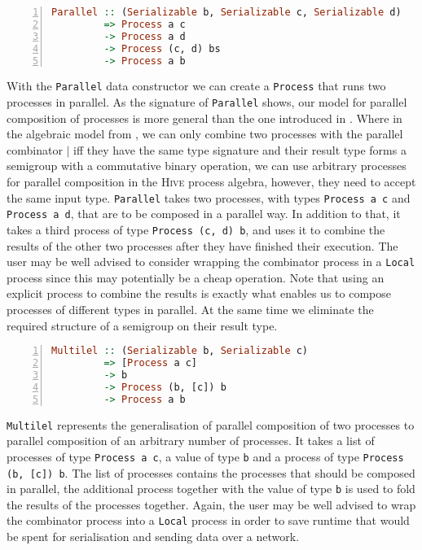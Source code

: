 \begin{lstlisting}[language=Haskell,caption=Signature of the \texttt{Parallel} type constructor.,numbers=left,frame=bt]
Parallel :: (Serializable b, Serializable c, Serializable d)
         => Process a c
         -> Process a d
         -> Process (c, d) bs
         -> Process a b
\end{lstlisting}
With the \texttt{Parallel} data constructor we can create a \texttt{Process} that runs two processes in parallel. As the signature of \texttt{Parallel} shows, our model for parallel composition of processes is more general than the one introduced in . Where in the algebraic model from , we can only combine two processes with the parallel combinator $|$ iff they have the same type signature and their result type forms a semigroup with a commutative binary operation, we can use arbitrary processes for parallel composition in the \textsc{Hive} process algebra, however, they need to accept the same input type. \texttt{Parallel} takes two processes, with types \texttt{Process a c} and \texttt{Process a d}, that are to be composed in a parallel way. In addition to that, it takes a third process of type \texttt{Process (c, d) b}, and uses it to combine the results of the other two processes after they have finished their execution. The user may be well advised to consider wrapping the combinator process in a \texttt{Local} process since this may potentially be a cheap operation. Note that using an explicit process to combine the results is exactly what enables us to compose processes of different types in parallel. At the same time we eliminate the required structure of a semigroup on their result type.

\begin{lstlisting}[language=Haskell,caption=Signature of the \texttt{Multilel} type constructor.,numbers=left,frame=bt]
Multilel :: (Serializable b, Serializable c)
         => [Process a c]
         -> b
         -> Process (b, [c]) b
         -> Process a b
\end{lstlisting}
\texttt{Multilel} represents the generalisation of parallel composition of two processes to parallel composition of an arbitrary number of processes. It takes a list of processes of type \texttt{Process a c}, a value of type \texttt{b} and a process of type \texttt{Process (b, [c]) b}. The list of processes contains the processes that should be composed in parallel, the additional process together with the value of type \texttt{b} is used to fold the results of the processes together. Again, the user may be well advised to wrap the combinator process into a \texttt{Local} process in order to save runtime that would be spent for serialisation and sending data over a network. 

